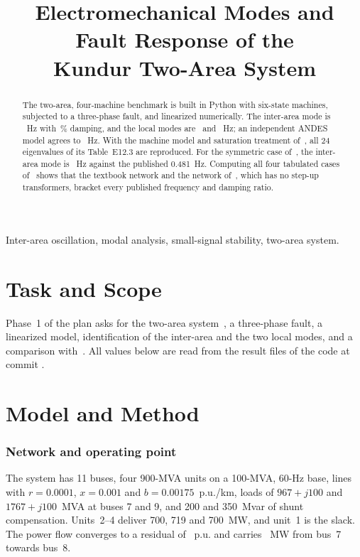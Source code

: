 \documentclass[conference,letterpaper]{IEEEtran}
\begin{document}
\title{Electromechanical Modes and Fault Response of the\\Kundur Two-Area System}
\author{
}
\maketitle

\begin{abstract}
The two-area, four-machine benchmark is built in Python with six-state machines, subjected to a three-phase fault, and linearized numerically. The inter-area mode is \VfIA~Hz with \VzIA\,\% damping, and the local modes are \VfLA\ and \VfLB~Hz; an independent ANDES model agrees to \Vandesdf~Hz. With the machine model and saturation treatment of~\cite{kundur}, all 24 eigenvalues of its Table~E12.3 are reproduced. For the symmetric case of~\cite{klein}, the inter-area mode is \Vfsym~Hz against the published 0.481~Hz. Computing all four tabulated cases of~\cite{klein} shows that the textbook network and the network of~\cite{klein}, which has no step-up transformers, bracket every published frequency and damping ratio.
\end{abstract}
\begin{IEEEkeywords}
Inter-area oscillation, modal analysis, small-signal stability, two-area system.
\end{IEEEkeywords}

\section{Task and Scope}
Phase~1 of the plan asks for the two-area system~\cite{kundur,klein}, a three-phase fault, a linearized model, identification of the inter-area and the two local modes, and a comparison with~\cite{klein}. All values below are read from the result files of the code at commit \texttt{\Vcommit}.

\section{Model and Method}
\subsubsection*{Network and operating point}
The system has 11 buses, four 900-MVA units on a 100-MVA, 60-Hz base, lines with $r=0.0001$, $x=0.001$ and $b=0.00175$~p.u./km, loads of $967+j100$ and $1767+j100$~MVA at buses 7 and 9, and 200 and 350~Mvar of shunt compensation. Units~2--4 deliver 700, 719 and 700~MW, and unit~1 is the slack. The power flow converges to a residual of \Vpfres~p.u. and carries \Vtie~MW from bus~7 towards bus~8.
\end{document}

